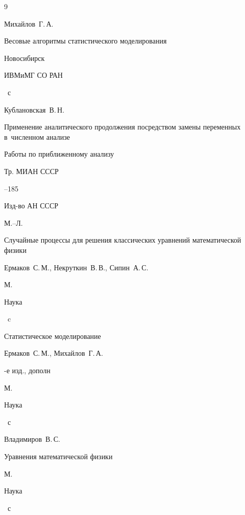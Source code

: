 \begin{thebibliography}{9}


\by Михайлов~Г.\,А.

\book Весовые алгоритмы статистического моделирования

\publaddr Новосибирск

\publ  ИВМиМГ СО РАН


~с




\by Кублановская~В.\,Н.

\paper Применение аналитического продолжения посредством замены переменных в~численном анализе

\inbook Работы по приближенному анализу

\serial Тр. \mbox{МИАН} СССР



--185

\publ Изд-во АН СССР

\publaddr М.--Л.






\book Случайные процессы для решения классических уравнений математической физики

\by Ермаков~С.\,М., Некруткин~В.\,В.,  Сипин~А.\,С.

\publaddr М.

\publ Наука


~c




\book Статистическое моделирование

\by Ермаков~С.\,М.,  Михайлов~Г.\,А.

-е изд.,  дополн

\publaddr М.

\publ Наука


~с




\by Владимиров~В.\,С.

\book Уравнения математической физики

\publaddr М.

\publ Наука


~с

\end{thebibliography}







\makeengtitlem




% 


